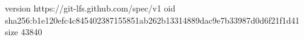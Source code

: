 version https://git-lfs.github.com/spec/v1
oid sha256:b1e120efc4c845402387155851ab262b13314889dac9e7b33987d0d6f21f1d41
size 43840

